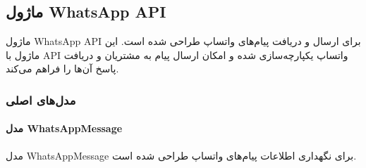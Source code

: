 \documentclass[letterpaper,10pt,english]{sphinxmanual}
\begin{document}
\sphinxstepscope


\subsection{ماژول WhatsApp API}
\label{\detokenize{modules/whatsapp_api:whatsapp-api}}\label{\detokenize{modules/whatsapp_api:whatsapp-api-module}}\label{\detokenize{modules/whatsapp_api::doc}}
\sphinxAtStartPar
ماژول WhatsApp API برای ارسال و دریافت پیام‌های واتساپ طراحی شده است. این ماژول با API واتساپ یکپارچه‌سازی شده و امکان ارسال پیام به مشتریان و دریافت پاسخ آن‌ها را فراهم می‌کند.


\subsubsection{مدل‌های اصلی}
\label{\detokenize{modules/whatsapp_api:id1}}

\paragraph{مدل WhatsAppMessage}
\label{\detokenize{modules/whatsapp_api:whatsappmessage}}
\sphinxAtStartPar
مدل WhatsAppMessage برای نگهداری اطلاعات پیام‌های واتساپ طراحی شده است.
\end{document}

